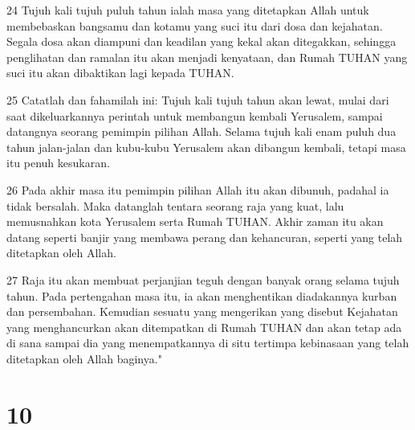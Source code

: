 \par 24 Tujuh kali tujuh puluh tahun ialah masa yang ditetapkan Allah untuk membebaskan bangsamu dan kotamu yang suci itu dari dosa dan kejahatan. Segala dosa akan diampuni dan keadilan yang kekal akan ditegakkan, sehingga penglihatan dan ramalan itu akan menjadi kenyataan, dan Rumah TUHAN yang suci itu akan dibaktikan lagi kepada TUHAN.
\par 25 Catatlah dan fahamilah ini: Tujuh kali tujuh tahun akan lewat, mulai dari saat dikeluarkannya perintah untuk membangun kembali Yerusalem, sampai datangnya seorang pemimpin pilihan Allah. Selama tujuh kali enam puluh dua tahun jalan-jalan dan kubu-kubu Yerusalem akan dibangun kembali, tetapi masa itu penuh kesukaran.
\par 26 Pada akhir masa itu pemimpin pilihan Allah itu akan dibunuh, padahal ia tidak bersalah. Maka datanglah tentara seorang raja yang kuat, lalu memusnahkan kota Yerusalem serta Rumah TUHAN. Akhir zaman itu akan datang seperti banjir yang membawa perang dan kehancuran, seperti yang telah ditetapkan oleh Allah.
\par 27 Raja itu akan membuat perjanjian teguh dengan banyak orang selama tujuh tahun. Pada pertengahan masa itu, ia akan menghentikan diadakannya kurban dan persembahan. Kemudian sesuatu yang mengerikan yang disebut Kejahatan yang menghancurkan akan ditempatkan di Rumah TUHAN dan akan tetap ada di sana sampai dia yang menempatkannya di situ tertimpa kebinasaan yang telah ditetapkan oleh Allah baginya."

\chapter{10}

